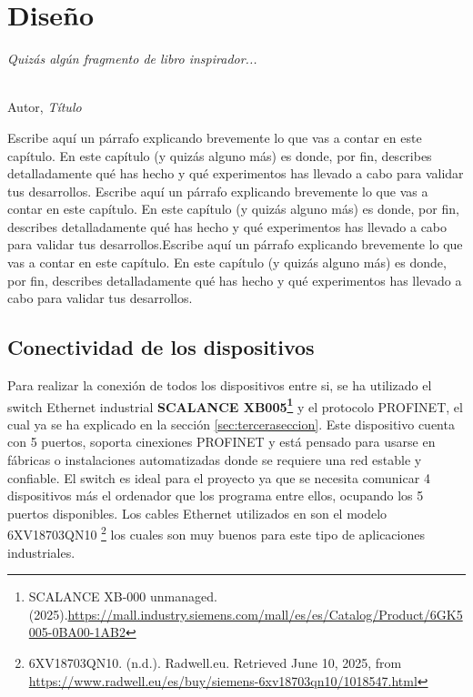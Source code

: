 \chapter{Diseño}
\label{cap:capitulo4}

\begin{flushright}
\begin{minipage}[]{10cm}
\emph{Quizás algún fragmento de libro inspirador...}\\
\end{minipage}\\

Autor, \textit{Título}\\
\end{flushright}

\vspace{1cm}

Escribe aquí un párrafo explicando brevemente lo que vas a contar en este capítulo. En este capítulo (y quizás alguno más) es donde, por fin, describes detalladamente qué has hecho y qué experimentos has llevado a cabo para validar tus desarrollos. Escribe aquí un párrafo explicando brevemente lo que vas a contar en este capítulo. En este capítulo (y quizás alguno más) es donde, por fin, describes detalladamente qué has hecho y qué experimentos has llevado a cabo para validar tus desarrollos.Escribe aquí un párrafo explicando brevemente lo que vas a contar en este capítulo. En este capítulo (y quizás alguno más) es donde, por fin, describes detalladamente qué has hecho y qué experimentos has llevado a cabo para validar tus desarrollos.

\section{Conectividad de los dispositivos}
\label{sec:conectividad_dispositivos}

Para realizar la conexión de todos los dispositivos entre si, se ha utilizado el switch Ethernet industrial \textbf{SCALANCE XB005\footnote{SCALANCE XB-000 unmanaged. (2025).\url{https://mall.industry.siemens.com/mall/es/es/Catalog/Product/6GK5005-0BA00-1AB2}}} y el protocolo PROFINET, el cual ya se ha explicado en la sección \ref{sec:terceraseccion}. Este dispositivo cuenta con 5 puertos, soporta cinexiones PROFINET y está pensado para usarse en fábricas o instalaciones automatizadas donde se requiere una red estable y confiable. El switch es ideal para el proyecto ya que se necesita comunicar 4 dispositivos más el ordenador que los programa entre ellos, ocupando los 5 puertos disponibles. Los cables Ethernet utilizados en son el modelo 6XV18703QN10 \footnote{6XV18703QN10. (n.d.). Radwell.eu. Retrieved June 10, 2025, from \url{https://www.radwell.eu/es/buy/siemens-6xv18703qn10/1018547.html}} los cuales son muy buenos para este tipo de aplicaciones industriales.  \\

